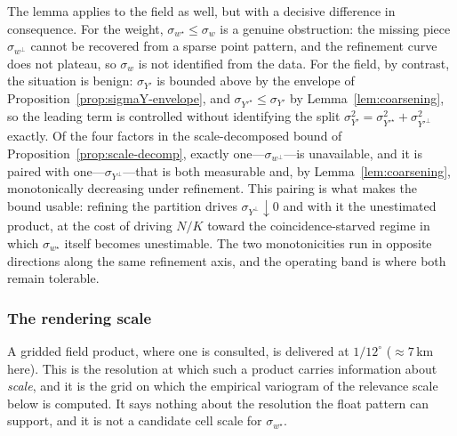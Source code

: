 The lemma applies to the field as well, but with a decisive difference in
consequence. For the weight, $\sigma_{w^{\star}}\le\sigma_w$ is a genuine
obstruction: the missing piece $\sigma_{w^{\perp}}$ cannot be recovered
from a sparse point pattern, and the refinement curve does not plateau,
so $\sigma_w$ is not identified from the data. For the field, by
contrast, the situation is benign: $\sigma_{Y'}$ is bounded above by the
envelope of Proposition~\ref{prop:sigmaY-envelope}, and
$\sigma_{Y'^{\star}}\le\sigma_{Y'}$ by Lemma~\ref{lem:coarsening}, so the
leading term is controlled without identifying the split
$\sigma_{Y'}^2=\sigma_{Y'^{\star}}^2+\sigma_{Y'^{\perp}}^2$ exactly. Of the four factors in the scale-decomposed bound of
Proposition~\ref{prop:scale-decomp}, exactly one---$\sigma_{w^{\perp}}$---is
unavailable, and it is paired with one---$\sigma_{Y^{\perp}}$---that is
both measurable and, by Lemma~\ref{lem:coarsening}, monotonically
decreasing under refinement. This pairing is what makes the bound usable:
refining the partition drives $\sigma_{Y^{\perp}}\downarrow 0$ and with it
the unestimated product, at the cost of driving $N/K$ toward the
coincidence-starved regime in which $\sigma_{w^{\star}}$ itself becomes
unestimable. The two monotonicities run in opposite directions along the
same refinement axis, and the operating band is where both remain
tolerable.


\subsubsection*{The rendering scale}

A gridded field product, where one is consulted, is delivered at
$1/12^\circ$ (${\approx}7$\,km here). This is the resolution at which such
a product carries information about \emph{scale}, and it is the grid on
which the empirical variogram of the relevance scale below is computed.
It says nothing about the resolution the float pattern can support, and
it is not a candidate cell scale for $\sigma_{w^{\star}}$.

